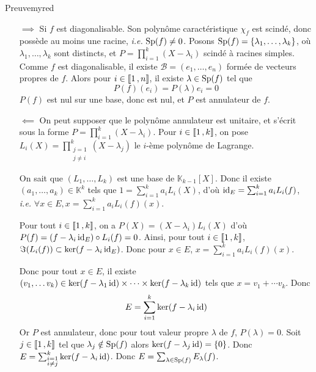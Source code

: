    \begin{demo}{Preuve}{myred}
        \begin{itemize}
            \item[$\implies$] Si $f$ est diagonalisable. Son polynôme caractéristique $\chi_f$ est scindé, donc possède au moins une racine, \textit{i.e.} $\operatorname{Sp}(f) \neq 0$. Posons $\operatorname{Sp}(f) = \left\{\lambda_1,\ldots,\lambda_k\right\}$, où $\lambda_1,\ldots,\lambda_k$ sont distincts, et $P = \prod_{i=1}^k (X-\lambda_i)$ scindé à racines simples. Comme $f$ est diagonalisable, il existe $\mathcal{B} = (e_1,\ldots, e_n)$ formée de vecteurs propres de $f$. Alors pour $i \in \left\llbracket 1 \, , n \right\rrbracket$, il existe $\lambda \in \operatorname{Sp}(f)$ tel que 
            \[ P(f)(e_i) = P(\lambda)e_i = 0 \]
            $P(f)$ est nul sur une base, donc est nul, et $P$ est annulateur de $f$.
            \item[$\impliedby$] On peut supposer que le polynôme annulateur est unitaire, et s’écrit sous la forme $P = \prod_{i=1}^{k}(X - \lambda_i)$. Pour $i \in \left\llbracket 1 \, , k \right\rrbracket$, on pose $L_i(X) = \prod_{\substack{j = 1 \\ j \neq i}}^{k} (X - \lambda_j)$ le $i$-ème polynôme de Lagrange. 
            
            On sait que $(L_1,\ldots,L_k)$ est une base de $\mathbb{K}_{k-1}[X]$. Donc il existe $(a_1,\ldots,a_k) \in \mathbb{K}^k$ tels que $1 = \sum_{i=1}^{k} a_i L_i(X)$, d’où $\operatorname{id}_E = \sum_{i=1}^{k} a_i L_i(f)$, \textit{i.e.} $\forall x \in E, x = \sum_{i=1}^{k} a_i L_i(f)(x)$.

            Pour tout $i \in \left\llbracket 1 \, , k \right\rrbracket$, on a $P(X) = (X - \lambda_i) L_i(X)$ d’où $P(f) = \left(f - \lambda_i \operatorname{id}_E\right) \circ L_i(f) = 0$. Ainsi, pour tout $i \in \left\llbracket 1 \, , k \right\rrbracket$, $\Im(L_i(f)) \subset \ker(f - \lambda_i \operatorname{id}_E)$. Donc pour $x \in E$, $x = \sum_{i=1}^{k} a_i L_i(f)(x)$. 

            Donc pour tout $x \in E$, il existe $(v_1, \ldots v_k) \in \ker(f - \lambda_1 \operatorname{id}) \times \cdots \times \ker(f - \lambda_k \operatorname{id})$ tels que $x = v_1 + \cdots v_k$. Donc 
            \[ E = \sum_{i=1}^{k} \ker(f - \lambda_i \operatorname{id}) \]
            Or $P$ est annulateur, donc pour tout valeur propre $\lambda$ de $f$, $P(\lambda) = 0$. Soit $j \in \left\llbracket 1 \, , k \right\rrbracket$ tel que $\lambda_j \notin \operatorname{Sp}(f)$ alors $\ker(f - \lambda_j \operatorname{id}) = \left\{0\right\}$. Donc $E = \sum_{\substack{i = 1 \\ i \neq j}}^{k} \ker(f - \lambda_i \operatorname{id})$. Donc $E = \sum_{\lambda \in \operatorname{Sp}(f)} E_{\lambda}(f)$.
        \end{itemize}
    \end{demo}

